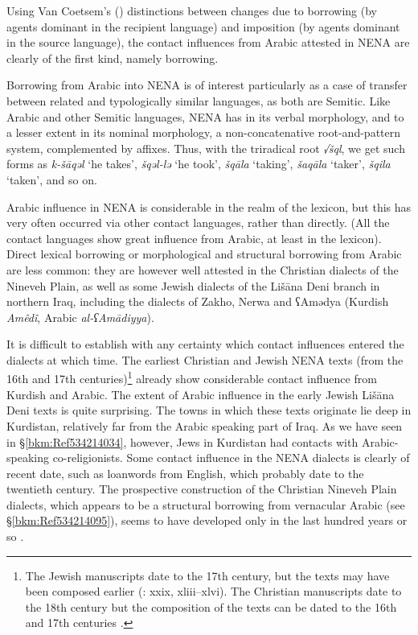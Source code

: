\documentclass[output=paper]{langsci/langscibook}
\begin{document}
Using Van Coetsem’s (\citeyear{VanCoetsem1988,VanCoetsem2000}) distinctions between changes due to borrowing (by agents dominant in the recipient language) and imposition (by agents dominant in the source language), the contact influences from Arabic attested in NENA are clearly of the first kind, namely borrowing.

Borrowing from Arabic into NENA is of interest particularly as a case of transfer between related and typologically similar languages, as both are Semitic. Like Arabic and other Semitic languages, NENA has in its verbal morphology, and to a lesser extent in its nominal morphology, a non-concatenative root-and-pattern system, complemented by affixes. Thus, with the triradical root \textit{√šql}, we get such forms as \textit{k-šāqəl} ‘he takes’, \textit{šqəl-lə} ‘he took’, \textit{šqāla} ‘taking’, \textit{šaqāla} ‘taker’, \textit{šqila} ‘taken’, and so on.

Arabic influence in NENA is considerable in the realm of the lexicon, but this has very often occurred via other contact languages, rather than directly. (All the contact languages show great influence from Arabic, at least in the lexicon). Direct lexical borrowing or morphological and structural borrowing from Arabic are less common: they are however well attested in the Christian dialects of the Nineveh Plain, as well as some Jewish dialects of the Lišāna Deni branch in northern Iraq, including the dialects of Zakho, Nerwa and ʕAmədya (Kurdish \textit{Amêdî}, Arabic \textit{al\nobreakdash-ʕAmādiyya}).

It is difficult to establish with any certainty which contact influences entered the dialects at which time. The earliest Christian and Jewish NENA texts (from the 16th and 17th centuries)\footnote{The Jewish manuscripts date to the 17th century, but the texts may have been composed earlier (\citealt{Sabar1976}: xxix, xliii–xlvi). The Christian manuscripts date to the 18th century but the composition of the texts can be dated to the 16th and 17th centuries \citep[16]{Mengozzi2002}.} already show considerable contact influence from Kurdish and Arabic. The extent of Arabic influence in the early Jewish Lišāna Deni texts \citep{Sabar1984} is quite surprising. The towns in which these texts originate lie deep in Kurdistan, relatively far from the Arabic speaking part of Iraq. As we have seen in §\ref{bkm:Ref534214034}, however, Jews in Kurdistan had contacts with Arabic-speaking co{}-religionists. Some contact influence in the NENA dialects is clearly of recent date, such as loanwords from English, which probably date to the twentieth century. The prospective construction of the Christian Nineveh Plain dialects, which appears to be a structural borrowing from vernacular Arabic (see §\ref{bkm:Ref534214095}), seems to have developed only in the last hundred years or so \citep[375]{Coghill2010}.
\end{document}
